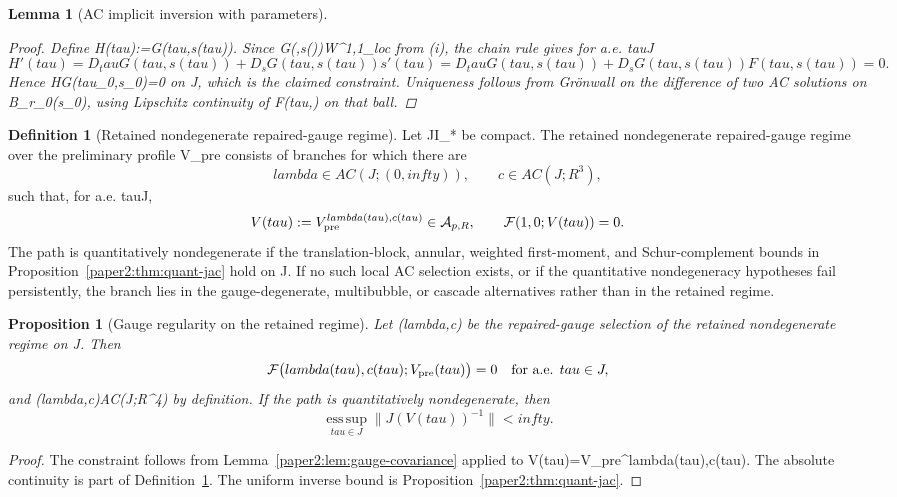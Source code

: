 \documentclass[11pt]{amsart}
\def\({}%
\def\){}%
\def\mathbb#1{#1}%
\def\tau{tau}%
\def\lambda{lambda}%
\def\infty{infty}%
\theoremstyle{plain}
\newtheorem{lemma}[theorem]{Lemma}
\newtheorem{proposition}[theorem]{Proposition}
\theoremstyle{definition}
\newtheorem{definition}[theorem]{Definition}
\theoremstyle{remark}
\begin{document}
\begin{lemma}[AC implicit inversion with parameters]
\begin{proof}
Define \(H(\tau):=G(\tau,s(\tau))\). Since \(G(\cdot,s(\cdot))\in W^{1,1}_{\rm loc}\) from (i),
the chain rule gives for a.e. \(\tau\in J\)
\[
H'(\tau)=D_\tau G(\tau,s(\tau))+D_sG(\tau,s(\tau))s'(\tau)
=D_\tau G(\tau,s(\tau))+D_sG(\tau,s(\tau))F(\tau,s(\tau))=0.
\]
Hence \(H\equiv G(\tau_0,s_0)=0\) on \(J\), which is the claimed constraint.
Uniqueness follows from Grönwall on the difference of two AC solutions on \(B_{r_0}(s_0)\),
using Lipschitz continuity of \(F(\tau,\cdot)\) on that ball.
\end{proof}
\end{lemma}

\begin{definition}[Retained nondegenerate repaired-gauge regime]\label{paper2:def:admissible-gauge-path}
Let \(J\subset I_*\) be compact. The retained nondegenerate repaired-gauge
regime over the preliminary profile \(V_{\rm pre}\) consists of branches for
which there are
\[
\lambda\in AC(J;(0,\infty)),\qquad c\in AC(J;\mathbb R^3),
\]
such that, for a.e. \(\tau\in J\),
\[
V(\tau):=V_{\rm pre}^{\lambda(\tau),c(\tau)}\in\mathcal A_{p,R},\qquad
\mathcal F(1,0;V(\tau))=0.
\]
The path is quantitatively nondegenerate if the translation-block, annular,
weighted first-moment, and Schur-complement bounds in
Proposition~\ref{paper2:thm:quant-jac} hold on \(J\).
If no such local AC selection exists, or if the quantitative nondegeneracy
hypotheses fail persistently, the branch lies in the gauge-degenerate,
multibubble, or cascade alternatives rather than in the retained regime.
\end{definition}

\begin{proposition}[Gauge regularity on the retained regime]\label{paper2:prop:preliminary-correction}
Let \((\lambda,c)\) be the repaired-gauge selection of the retained
nondegenerate regime on \(J\). Then
\[
\mathcal F\bigl(\lambda(\tau),c(\tau);V_{\rm pre}(\tau)\bigr)=0
\quad\text{for a.e. }\tau\in J,
\]
and \((\lambda,c)\in AC(J;\mathbb R^4)\) by definition. If the path is
quantitatively nondegenerate, then
\[
\operatorname*{ess\,sup}_{\tau\in J}\|J(V(\tau))^{-1}\|<\infty.
\]
\end{proposition}
\begin{proof}
The constraint follows from Lemma~\ref{paper2:lem:gauge-covariance} applied to
\(V(\tau)=V_{\rm pre}^{\lambda(\tau),c(\tau)}\). The absolute continuity is part
of Definition~\ref{paper2:def:admissible-gauge-path}. The uniform inverse bound is
Proposition~\ref{paper2:thm:quant-jac}.
\end{proof}
\end{document}
